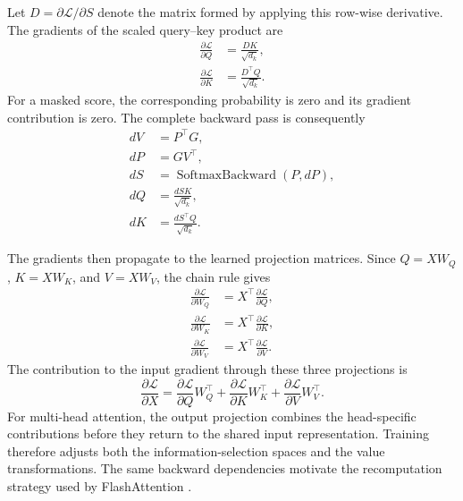 Let
\(D=\partial\mathcal{L}/\partial S\) denote the matrix formed by applying
this row-wise derivative. The gradients of the scaled query--key product
are
\begin{align}
    \frac{\partial\mathcal{L}}{\partial Q}
    &=
    \frac{DK}{\sqrt{d_k}},
    \label{eq:attn-gradient-query}\\
    \frac{\partial\mathcal{L}}{\partial K}
    &=
    \frac{D^\top Q}{\sqrt{d_k}}.
    \label{eq:attn-gradient-key}
\end{align}
For a masked score, the corresponding probability is zero and its
gradient contribution is zero. The complete backward pass is consequently
\begin{align}
    dV &= P^\top G,
    \label{eq:attn-backward-dv}\\
    dP &= GV^\top,
    \label{eq:attn-backward-dp}\\
    dS &= \operatorname{SoftmaxBackward}(P,dP),
    \label{eq:attn-backward-ds}\\
    dQ &= \frac{dSK}{\sqrt{d_k}},
    \label{eq:attn-backward-dq}\\
    dK &= \frac{dS^\top Q}{\sqrt{d_k}}.
    \label{eq:attn-backward-dk}
\end{align}

The gradients then propagate to the learned projection matrices. Since
\(Q=XW_Q\), \(K=XW_K\), and \(V=XW_V\), the chain rule gives
\begin{align}
    \frac{\partial\mathcal{L}}{\partial W_Q}
    &=
    X^\top\frac{\partial\mathcal{L}}{\partial Q},
    \label{eq:attn-gradient-wq}\\
    \frac{\partial\mathcal{L}}{\partial W_K}
    &=
    X^\top\frac{\partial\mathcal{L}}{\partial K},
    \label{eq:attn-gradient-wk}\\
    \frac{\partial\mathcal{L}}{\partial W_V}
    &=
    X^\top\frac{\partial\mathcal{L}}{\partial V}.
    \label{eq:attn-gradient-wv}
\end{align}
The contribution to the input gradient through these three projections is
\begin{equation}
    \frac{\partial\mathcal{L}}{\partial X}
    =
    \frac{\partial\mathcal{L}}{\partial Q}W_Q^\top
    +
    \frac{\partial\mathcal{L}}{\partial K}W_K^\top
    +
    \frac{\partial\mathcal{L}}{\partial V}W_V^\top.
    \label{eq:attn-gradient-input}
\end{equation}
For multi-head attention, the output projection combines the
head-specific contributions before they return to the shared input
representation. Training therefore adjusts both the information-selection
spaces and the value transformations. The same backward dependencies
motivate the recomputation strategy used by FlashAttention
\parencite{dao2023flashattention2}.

